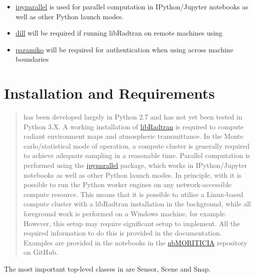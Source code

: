 \documentclass[a4paper,10pt,english]{sphinxmanual}
\begin{document}
\begin{itemize}
\item {} 
\href{https://ipyparallel.readthedocs.org/en/latest/}{ipyparallel} is used for parallel computation in IPython/Jupyter notebooks as well as other Python launch modes.

\item {} 
\href{https://pypi.python.org/pypi/dill}{dill} will be required if running libRadtran on remote machines using 

\item {} 
\href{https://pypi.python.org/pypi/paramiko/}{paramiko} will be required for authentication when using  across machine boundaries

\end{itemize}


\section{Installation and Requirements}
\label{how_to_use:installation-and-requirements}\begin{quote}

 has been developed largely in Python 2.7 and has not yet been tested in Python 3.X.
A working installation of \href{http://www.libradtran.org}{libRadtran} is required to compute radiant environment
maps and atmospheric transmittance. In the Monte carlo/statistical mode of operation, a compute cluster
is generally required to achieve adequate sampling in a reasonable time. Parallel computation is performed
using the \href{https://ipyparallel.readthedocs.org/en/latest/}{ipyparallel} package, which works in
IPython/Jupyter notebooks as well as other Python launch modes. In principle, with  it is possible
to run the Python worker engines on any network-accessible compute resource. This means that it is possible to
utilise a Linux-based compute cluster with a libRadtran installation in the background, while all foreground
work is performed on a Windows machine, for example. However, this setup may require
significant setup to implement. All the required information to do this is provided in the 
documentation. Examples are provided in the  notebooks in the \href{https://github.com/derekjgriffith/nbMORTICIA}{nbMORITICIA}  repository on GitHub.
\end{quote}

The most important top-level classes in  are Sensor, Scene and Snap.
\end{document}
